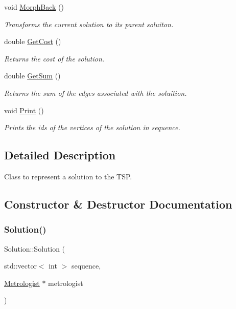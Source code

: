\begin{DoxyCompactItemize}
void \hyperlink{classSolution_a8fe3521e7356329fb01e36411815d370}{Morph\+Back} ()
\begin{DoxyCompactList}\small\item\em Transforms the current solution to its parent soluiton. \end{DoxyCompactList}\item 
\mbox{\label{classSolution_aea61490425a0340868691e585c5580bc}} 
double \hyperlink{classSolution_aea61490425a0340868691e585c5580bc}{Get\+Cost} ()
\begin{DoxyCompactList}\small\item\em Returns the cost of the solution. \end{DoxyCompactList}\item 
\mbox{\label{classSolution_a114f241db38921e4440ff7aa4804f1be}} 
double \hyperlink{classSolution_a114f241db38921e4440ff7aa4804f1be}{Get\+Sum} ()
\begin{DoxyCompactList}\small\item\em Returns the sum of the edges associated with the soluition. \end{DoxyCompactList}\item 
\mbox{\label{classSolution_af979c00336b04e6d7a68320073ebcdb3}} 
void \hyperlink{classSolution_af979c00336b04e6d7a68320073ebcdb3}{Print} ()
\begin{DoxyCompactList}\small\item\em Prints the ids of the vertices of the solution in sequence. \end{DoxyCompactList}\end{DoxyCompactItemize}


\subsection{Detailed Description}
Class to represent a solution to the T\+SP. 

\subsection{Constructor \& Destructor Documentation}
\mbox{\label{classSolution_a4a34a6366e3eedfba8e4e05d6385e0b7}} 
\subsubsection{\texorpdfstring{Solution()}{Solution()}\hspace{0.1cm}{\footnotesize\ttfamily [1/2]}}
{\footnotesize\ttfamily Solution\+::\+Solution (\begin{DoxyParamCaption}\item[{std\+::vector$<$ int $>$}]{sequence,  }\item[{\hyperlink{classMetrologist}{Metrologist} $\ast$}]{metrologist }\end{DoxyParamCaption})}



